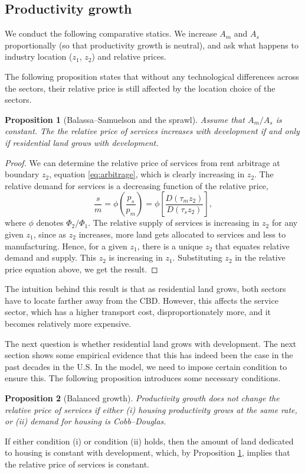 \documentclass[12pt]{article}
\newtheorem{proposition}{Proposition}
\begin{document}
\subsection{Productivity growth}
We conduct the following comparative statics. We increase $A_m$ and $A_s$ proportionally (so that productivity growth is neutral), and ask what happens to industry location ($z_1$, $z_2$) and relative prices.

The following proposition states that without any technological differences across the sectors, their relative price is still affected by the location choice of the sectors.
\begin{proposition}[Balassa--Samuelson and the sprawl]\label{prop:sprawl}
 Assume that $A_m/A_s$ is constant. The the relative price of services increases with development if and only if residential land grows with development.
\end{proposition}
\begin{proof}
We can determine the relative price of services from rent arbitrage at boundary $z_2$, equation \eqref{eq:arbitrage}, which is clearly increasing in $z_2$. The relative demand for services is a decreasing function of the relative price,
    \[
    \frac{s}{m} = \phi\left(\frac{p_s}{p_m}\right) = \phi\left[\frac{D(\tau_m z_2)}{D(\tau_s z_2)}\right],
    \]
where $\phi$ denotes $\Phi_2/\Phi_1$. The relative supply of services is increasing in $z_2$ for any given $z_1$, since as $z_2$ increases, more land gets allocated to services and less to manufacturing. Hence, for a given $z_1$, there is a unique $z_2$ that equates relative demand and supply. This $z_2$ is increasing in $z_1$. Substituting $z_2$ in the relative price equation above, we get the result.
\end{proof}

The intuition behind this result is that as residential land grows, both sectors have to locate farther away from the CBD. However, this affects the service sector, which has a higher transport cost, disproportionately more, and it becomes relatively more expensive.

The next question is whether residential land grows with development. The next section shows some empirical evidence that this has indeed been the case in the past decades in the U.S. In the model, we need to impose certain condition to ensure this. The following proposition introduces some necessary conditions.

\begin{proposition}[Balanced growth]
Productivity growth does not change the relative price of services if either
      (i) housing productivity grows at the same rate,
      or (ii) demand for housing is Cobb--Douglas.
\end{proposition}
If either condition (i) or condition (ii) holds, then the amount of land dedicated to housing is constant with development, which, by Proposition \ref{prop:sprawl}, implies that the relative price of services is constant.
\end{document}
